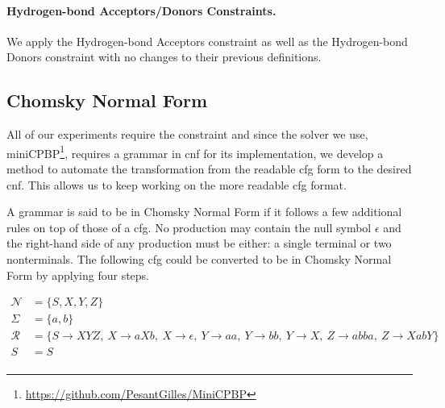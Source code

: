 \documentclass[../Document.tex]{subfiles}
\begin{document}
\paragraph{Hydrogen-bond Acceptors/Donors Constraints.}
We apply the Hydrogen-bond Acceptors constraint as well as the Hydrogen-bond Donors constraint with no changes to their previous definitions.


\subsection{Chomsky Normal Form}
All of our experiments require the \grammar constraint and since the solver we use, miniCPBP\footnote{\url{https://github.com/PesantGilles/MiniCPBP}}, requires a grammar in \gls{cnf} for its implementation, we develop a method to automate the transformation from the readable \gls{cfg} form to the desired \gls{cnf}. This allows us to keep working on the more readable \gls{cfg} format.

A grammar is said to be in Chomsky Normal Form if it follows a few additional rules on top of those of a \gls{cfg}. No production may contain the null symbol $\epsilon$ and the right-hand side of any production must be either: a single terminal or two nonterminals. The following \gls{cfg} could be converted to be in Chomsky Normal Form by applying four steps.

\begin{align*}
    \mathcal{N} &= \{S,X,Y,Z\}\\
    \Sigma &= \{a,b\}\\
    \mathcal{R} &= \{ S \rightarrow XYZ ,\  X \rightarrow aXb ,\  X \rightarrow \epsilon ,\  Y \rightarrow aa ,\   Y \rightarrow bb ,\ Y \rightarrow X ,\ Z \rightarrow abba ,\ Z \rightarrow XabY \}\\
    S &= S\\
\end{align*}
\end{document}
